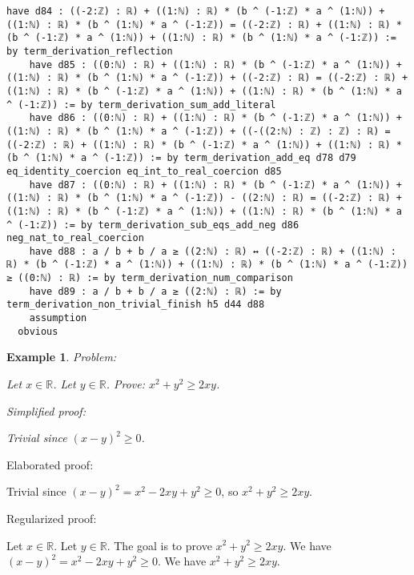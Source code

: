 \documentclass{article}
\newtheorem{example}{Example}
\begin{document}
\begin{tcolorbox}[colback=white!10, width=\linewidth]
\begin{lstlisting}[language=Lean4]
    have d84 : ((-2:ℤ) : ℝ) + ((1:ℕ) : ℝ) * (b ^ (-1:ℤ) * a ^ (1:ℕ)) + ((1:ℕ) : ℝ) * (b ^ (1:ℕ) * a ^ (-1:ℤ)) = ((-2:ℤ) : ℝ) + ((1:ℕ) : ℝ) * (b ^ (-1:ℤ) * a ^ (1:ℕ)) + ((1:ℕ) : ℝ) * (b ^ (1:ℕ) * a ^ (-1:ℤ)) := by term_derivation_reflection
    have d85 : ((0:ℕ) : ℝ) + ((1:ℕ) : ℝ) * (b ^ (-1:ℤ) * a ^ (1:ℕ)) + ((1:ℕ) : ℝ) * (b ^ (1:ℕ) * a ^ (-1:ℤ)) + ((-2:ℤ) : ℝ) = ((-2:ℤ) : ℝ) + ((1:ℕ) : ℝ) * (b ^ (-1:ℤ) * a ^ (1:ℕ)) + ((1:ℕ) : ℝ) * (b ^ (1:ℕ) * a ^ (-1:ℤ)) := by term_derivation_sum_add_literal
    have d86 : ((0:ℕ) : ℝ) + ((1:ℕ) : ℝ) * (b ^ (-1:ℤ) * a ^ (1:ℕ)) + ((1:ℕ) : ℝ) * (b ^ (1:ℕ) * a ^ (-1:ℤ)) + ((-((2:ℕ) : ℤ) : ℤ) : ℝ) = ((-2:ℤ) : ℝ) + ((1:ℕ) : ℝ) * (b ^ (-1:ℤ) * a ^ (1:ℕ)) + ((1:ℕ) : ℝ) * (b ^ (1:ℕ) * a ^ (-1:ℤ)) := by term_derivation_add_eq d78 d79 eq_identity_coercion eq_int_to_real_coercion d85
    have d87 : ((0:ℕ) : ℝ) + ((1:ℕ) : ℝ) * (b ^ (-1:ℤ) * a ^ (1:ℕ)) + ((1:ℕ) : ℝ) * (b ^ (1:ℕ) * a ^ (-1:ℤ)) - ((2:ℕ) : ℝ) = ((-2:ℤ) : ℝ) + ((1:ℕ) : ℝ) * (b ^ (-1:ℤ) * a ^ (1:ℕ)) + ((1:ℕ) : ℝ) * (b ^ (1:ℕ) * a ^ (-1:ℤ)) := by term_derivation_sub_eqs_add_neg d86 neg_nat_to_real_coercion
    have d88 : a / b + b / a ≥ ((2:ℕ) : ℝ) ↔ ((-2:ℤ) : ℝ) + ((1:ℕ) : ℝ) * (b ^ (-1:ℤ) * a ^ (1:ℕ)) + ((1:ℕ) : ℝ) * (b ^ (1:ℕ) * a ^ (-1:ℤ)) ≥ ((0:ℕ) : ℝ) := by term_derivation_num_comparison
    have d89 : a / b + b / a ≥ ((2:ℕ) : ℝ) := by term_derivation_non_trivial_finish h5 d44 d88
    assumption
  obvious

\end{lstlisting}
\end{tcolorbox}


\begin{example}
Problem:
\begin{tcolorbox}[colback=yellow!10, width=\linewidth]
Let $x\in\mathbb{R}$. Let $y\in\mathbb{R}$.
    Prove: $x^2 + y^2 \ge 2xy$.
\end{tcolorbox}

Simplified proof:
\begin{tcolorbox}[colback=blue!10, width=\linewidth]
Trivial since $(x-y)^2 \ge 0$.
\end{tcolorbox}
\end{example}

Elaborated proof:
\begin{tcolorbox}[colback=green!10, width=\linewidth]
Trivial since $(x-y)^2 = x^2 -2xy + y^2 \ge 0$, so $x^2 + y^2 \ge 2xy$.
\end{tcolorbox}

Regularized proof:
\begin{tcolorbox}[colback=red!10, width=\linewidth]
Let $x\in\mathbb{R}$.
Let $y\in\mathbb{R}$.
The goal is to prove $x^2 + y^2 \ge 2xy$.
We have ${{(x-y)}}^2 = x^2 -2xy + y^2 \ge 0$.
We have $x^2 + y^2 \ge 2xy$.
\end{tcolorbox}
\end{document}
